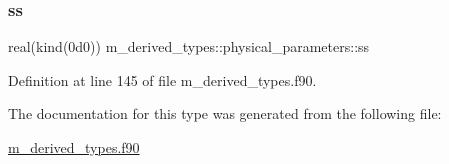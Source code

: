 \subsubsection{\texorpdfstring{ss}{ss}}
{\footnotesize\ttfamily real(kind(0d0)) m\+\_\+derived\+\_\+types\+::physical\+\_\+parameters\+::ss}



Definition at line 145 of file m\+\_\+derived\+\_\+types.\+f90.



The documentation for this type was generated from the following file\+:\begin{DoxyCompactItemize}
\item 
\hyperlink{m__derived__types_8f90}{m\+\_\+derived\+\_\+types.\+f90}\end{DoxyCompactItemize}
